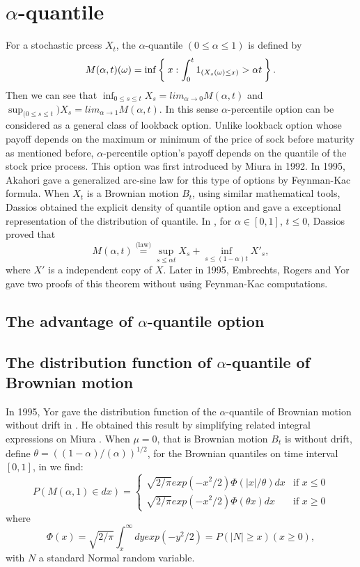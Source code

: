 \documentclass[11pt]{book}
\def\eqlaw{{\stackrel{\text{(law)}}{=}}}
\begin{document}
\section{$\alpha$-quantile}
For a stochastic prcess $X_t$,
the $\alpha$-quantile $( 0 \leq \alpha \leq 1)$ 
is defined by 
\[
M(\alpha,t)(\omega) = \inf\Set{x:\int_0^t 1_{(X_s (\omega)\leq x)} > \alpha t}.
\]
Then we can see that $\inf_{0\leq s \leq t}  X_s = lim_{\alpha\to 0}M(\alpha,t)$ and $\sup_{(0\leq s \leq t})  X_s = lim_{\alpha\to 1} M(\alpha, t)$. In this sense $\alpha$-percentile option can be considered as a general class of lookback option. Unlike lookback option whose payoff depends on the maximum or minimum of the price of sock before maturity as mentioned before, $\alpha$-percentile option's payoff depends on the quantile of the stock price process. This option was first introduced by Miura\cite{Miura} in 1992. In 1995, Akahori\cite{Akahori1995} gave a generalized arc-sine law for this type of options by Feynman-Kac formula.
When $X_{t}$ is a Brownian motion $B_t$, using similar mathematical tools, Dassios obtained the explicit density of quantile option and gave a exceptional representation of the distribution of quantile.  In \cite{Dassios1995}, for $\alpha\in[0,1]$, $t\leq 0$, Dassios proved that 
\begin{equation}\label{eq:Dassios}
M(\alpha, t) \eqlaw \sup_{s \leq \alpha t} X_s + \inf_{s\leq (1-\alpha)t} X'_s ,
\end{equation}
where $X'$ is a independent copy of $X$. Later in 1995, Embrechts, Rogers and Yor \cite{EmRoge1995} gave two proofs of this theorem without using Feynman-Kac computations. 
\subsection{The advantage of $\alpha$-quantile option}
\cite{Ballotta}
\subsection{The distribution function of $\alpha$-quantile of Brownian motion}
In 1995, Yor gave the distribution function of the $\alpha$-quantile of Brownian motion without drift in \cite{Yor1995}. He obtained this result by simplifying related integral expressions on Miura \cite{Miura}. When $\mu = 0$, that is Brownian motion $B_t$ is without drift, define $\theta = ((1 - \alpha)/(\alpha))^{1/2}$, for the Brownian quantiles on time interval $[0, 1]$,  in \cite{Yor1995} we find:
\begin{equation}
P(M(\alpha,1)\in dx)= \begin{cases} 
\sqrt{2 / \pi}exp(-x^2 / 2) \Phi(|x| / \theta)dx  &  \text{if } x \leq 0 \\
\sqrt{2 / \pi}exp(-x^2 / 2) \Phi(\theta x)dx  &  \text{if } x \geq 0 
\end{cases}
\end{equation}
where 
\begin{equation}\label{eq:density}
\Phi (x) = \sqrt{2/ \pi} \int^{\infty}_x dy exp(-y^2 / 2) = P (|N| \geq x)     (x \geq 0),
\end{equation}
with $N$ a standard Normal random variable. 
\end{document}
